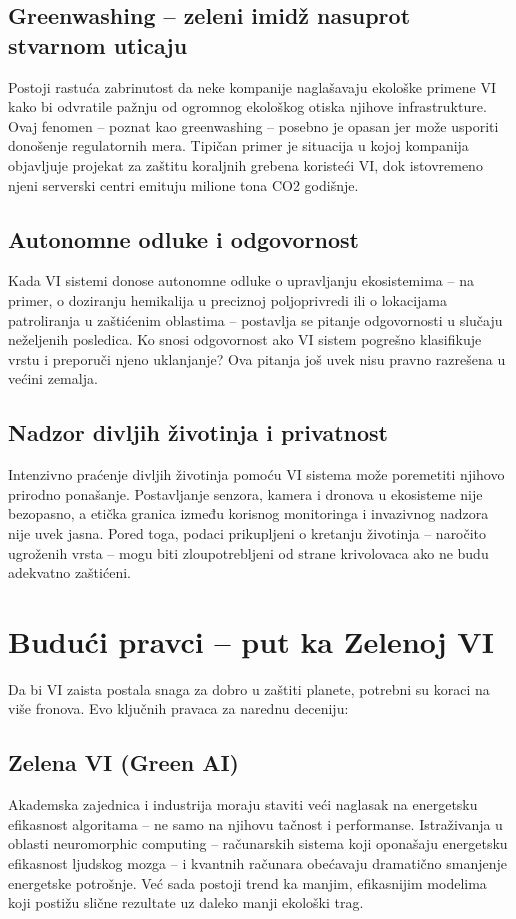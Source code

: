 \documentclass[12pt,a4paper]{article}
\begin{document}
\subsection{Greenwashing -- zeleni imidž nasuprot stvarnom uticaju}
Postoji rastuća zabrinutost da neke kompanije naglašavaju ekološke primene VI kako bi odvratile pažnju od ogromnog ekološkog otiska njihove infrastrukture. Ovaj fenomen -- poznat kao greenwashing -- posebno je opasan jer može usporiti donošenje regulatornih mera. Tipičan primer je situacija u kojoj kompanija objavljuje projekat za zaštitu koraljnih grebena koristeći VI, dok istovremeno njeni serverski centri emituju milione tona CO2 godišnje.

\subsection{Autonomne odluke i odgovornost}
Kada VI sistemi donose autonomne odluke o upravljanju ekosistemima -- na primer, o doziranju hemikalija u preciznoj poljoprivredi ili o lokacijama patroliranja u zaštićenim oblastima -- postavlja se pitanje odgovornosti u slučaju neželjenih posledica. Ko snosi odgovornost ako VI sistem pogrešno klasifikuje vrstu i preporuči njeno uklanjanje? Ova pitanja još uvek nisu pravno razrešena u većini zemalja.

\subsection{Nadzor divljih životinja i privatnost}
Intenzivno praćenje divljih životinja pomoću VI sistema može poremetiti njihovo prirodno ponašanje. Postavljanje senzora, kamera i dronova u ekosisteme nije bezopasno, a etička granica između korisnog monitoringa i invazivnog nadzora nije uvek jasna. Pored toga, podaci prikupljeni o kretanju životinja -- naročito ugroženih vrsta -- mogu biti zloupotrebljeni od strane krivolovaca ako ne budu adekvatno zaštićeni.

\section{Budući pravci -- put ka Zelenoj VI}
Da bi VI zaista postala snaga za dobro u zaštiti planete, potrebni su koraci na više fronova. Evo ključnih pravaca za narednu deceniju:

\subsection{Zelena VI (Green AI)}
Akademska zajednica i industrija moraju staviti veći naglasak na energetsku efikasnost algoritama -- ne samo na njihovu tačnost i performanse. Istraživanja u oblasti neuromorphic computing -- računarskih sistema koji oponašaju energetsku efikasnost ljudskog mozga -- i kvantnih računara obećavaju dramatično smanjenje energetske potrošnje. Već sada postoji trend ka manjim, efikasnijim modelima koji postižu slične rezultate uz daleko manji ekološki trag.
\end{document}
